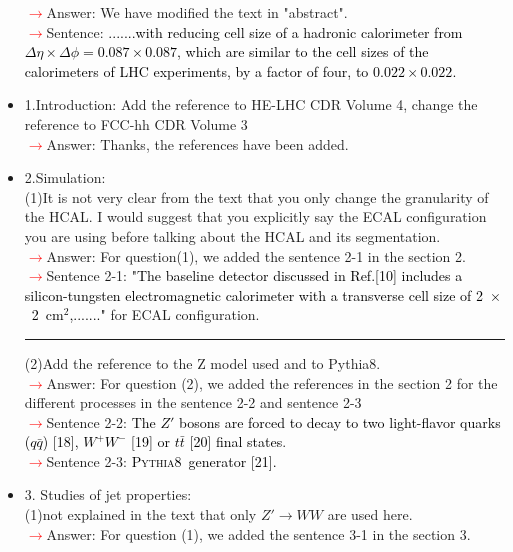 \documentclass[final,1p,11pt]{elsarticle}
\newcommand{\pythia} {\textsc{Pythia8~}}
\begin{document}
\begin{itemize}
 \textcolor{red}{$\rightarrow$}Answer: We have modified the text in "abstract".\\
 \textcolor{red}{$\rightarrow$}Sentence: \textcolor{black}{.......with reducing cell size of a hadronic calorimeter 
from $\Delta \eta \times \Delta \phi = 0.087\times0.087$,
which are similar to the cell sizes of the calorimeters of LHC experiments, by a factor of four, to  $0.022\times0.022$.} 
\item 1.Introduction: Add the reference to HE-LHC CDR Volume 4, change the reference to FCC-hh CDR Volume 3\\
\textcolor{red}{$\rightarrow$}Answer: Thanks, the references have been added.
\item 2.Simulation:\\
(1)It is not very clear from the text that you only change the granularity of the HCAL. I would suggest that you explicitly say the ECAL configuration you are using before talking about the HCAL and its segmentation.\\
 \textcolor{red}{$\rightarrow$}Answer: For question(1), we added the sentence 2-1 in the section 2.\\
 \textcolor{red}{$\rightarrow$}Sentence 2-1: \textcolor{black}{"The baseline detector discussed in Ref.[10]
includes a silicon-tungsten electromagnetic calorimeter with a transverse cell size of 2~$\times$~2~cm$^2$,......."} for ECAL configuration.\\
 \rule{\textwidth}{0.4pt}
(2)Add the reference to the Z model used and to Pythia8.\\
 \textcolor{red}{$\rightarrow$}Answer: For question (2), we added the references in the section 2 for the different processes in the sentence 2-2 and sentence 2-3 \\
\textcolor{red}{$\rightarrow$}Sentence 2-2:  \textcolor{black}{The $Z'$ bosons are forced to decay to two light-flavor quarks ($q\bar{q}$) [18], $W^+W^-$ [19] or $t\bar{t}$ [20] final states}.\\
\textcolor{red}{$\rightarrow$}Sentence 2-3: \textcolor{black}{\pythia generator [21].}\\
\item 3. Studies of jet properties:\\
(1)not explained in the text that only $Z' \rightarrow WW$ are used here. \\
 \textcolor{red}{$\rightarrow$}Answer: For question (1), we added the sentence 3-1  in the section 3.\\

\end{itemize}
\end{document}
